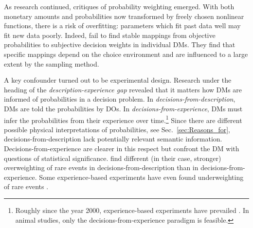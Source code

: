 \documentclass[a4paper, 12pt]{article}
\newcommand{\seclabel}[1]{\label{sec:#1}}
\newcommand{\secref}[1]{Sec.~\ref{sec:#1}}
\begin{document}
As research continued, critiques of probability weighting emerged. With both monetary amounts and probabilities now transformed by freely chosen nonlinear functions, there is a risk of overfitting: parameters which fit past data well may fit new data poorly. Indeed, \textcite{StewartETAL2015} fail to find stable mappings from objective probabilities to subjective decision weights in individual DMs. They find that specific mappings depend on the choice environment and are influenced to a large extent by the sampling method.

A key confounder turned out to be experimental design. Research under the heading of the \textit{description-experience gap} revealed that it matters how DMs are informed of probabilities in a decision problem. In \textit{decisions-from-description}, DMs are told the probabilities by DOs. In \textit{decisions-from-experience}, DMs must infer the probabilities from their experience over time.\footnote{Roughly since the year 2000, experience-based experiments have prevailed \parencite{HertwigETAL2004,HertwigErev2009,ErevETAL2010}. In animal studies, only the decisions-from-experience paradigm is feasible.} Since there are different possible physical interpretations of probabilities, see \secref{Reasons_for}, decisions-from-description lack potentially relevant semantic information. Decisions-from-experience are clearer in this respect but confront the DM with questions of statistical significance. \textcite{HertwigETAL2004} find different (in their case, stronger) overweighting of rare events in decisions-from-description than in decisions-from-experience. Some experience-based experiments have even found underweighting of rare events \parencites{UngemachETAL2009}[see esp. Tab. 9]{WulffETAL2018}.
\end{document}
